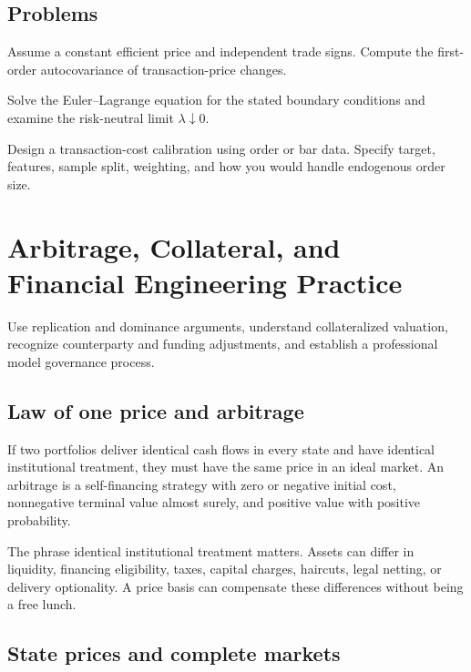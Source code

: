 \section{Problems}

\begin{exercise}
Assume a constant efficient price and independent trade signs. Compute the
first-order autocovariance of transaction-price changes.
\end{exercise}
\begin{exercise}
Solve the Euler--Lagrange equation for the stated boundary conditions and examine
the risk-neutral limit $\lambda\downarrow0$.
\end{exercise}
\begin{exercise}[Research]
Design a transaction-cost calibration using order or bar data. Specify target,
features, sample split, weighting, and how you would handle endogenous order size.
\end{exercise}


\chapter{Arbitrage, Collateral, and Financial Engineering Practice}

\begin{objectives}
Use replication and dominance arguments, understand collateralized valuation,
recognize counterparty and funding adjustments, and establish a professional model
governance process.
\end{objectives}

\section{Law of one price and arbitrage}

If two portfolios deliver identical cash flows in every state and have identical
institutional treatment, they must have the same price in an ideal market. An
arbitrage is a self-financing strategy with zero or negative initial cost,
nonnegative terminal value almost surely, and positive value with positive
probability.

The phrase identical institutional treatment matters. Assets can differ in
liquidity, financing eligibility, taxes, capital charges, haircuts, legal netting,
or delivery optionality. A price basis can compensate these differences without
being a free lunch.

\section{State prices and complete markets}


